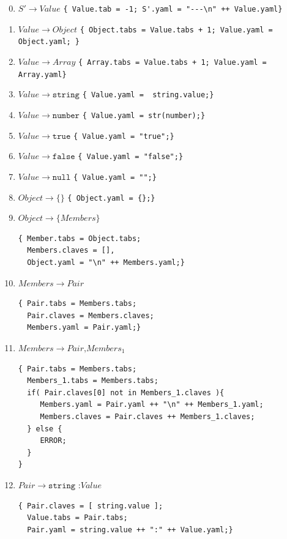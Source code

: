 \documentclass{article}
\begin{document}
	\begin{enumerate}[(1)]
		  \setcounter{enumi}{-1}
		  
		\item $S' \to Value$ \verb|{ Value.tab = -1; S'.yaml = "---\n" ++ Value.yaml}|
		\item $Value \to Object$ \verb|{ Object.tabs = Value.tabs + 1; Value.yaml = Object.yaml; }|
		\item $Value \to Array$ \verb|{ Array.tabs = Value.tabs + 1; Value.yaml = Array.yaml}|
\item $Value \to \texttt{string}$ \verb|{ Value.yaml =  string.value;}|
		\item $Value \to \texttt{number}$ \verb|{ Value.yaml = str(number);}|
		\item $Value \to \texttt{true}$ \verb|{ Value.yaml = "true";}|
		\item $Value \to \texttt{false}$ \verb|{ Value.yaml = "false";}|
		\item $Value \to \texttt{null}$ \verb|{ Value.yaml = "";}|
		\item $Object \to \texttt{\{ \}}$ \verb|{ Object.yaml = {};}|
		\item $Object \to \texttt{\{} Members \texttt{\}}$
		\begin{Verbatim}
{ Member.tabs = Object.tabs; 
  Members.claves = [], 
  Object.yaml = "\n" ++ Members.yaml;}
		\end{Verbatim}
		\item $Members \to Pair$
		\begin{verbatim}
{ Pair.tabs = Members.tabs;
  Pair.claves = Members.claves; 
  Members.yaml = Pair.yaml;}
		\end{verbatim}
		\item $Members \to Pair \texttt{,} Members_1$
		\begin{verbatim}
{ Pair.tabs = Members.tabs;
  Members_1.tabs = Members.tabs;
  if( Pair.claves[0] not in Members_1.claves ){
     Members.yaml = Pair.yaml ++ "\n" ++ Members_1.yaml;
     Members.claves = Pair.claves ++ Members_1.claves; 
  } else {
     ERROR;
  }
}
		\end{verbatim}
		\item $Pair \to \texttt{string :} Value$ 
		\begin{verbatim}
{ Pair.claves = [ string.value ];
  Value.tabs = Pair.tabs;
  Pair.yaml = string.value ++ ":" ++ Value.yaml;}
		\end{verbatim}
		

\end{enumerate}
\end{document}

